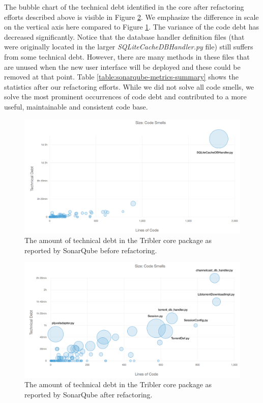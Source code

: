 The bubble chart of the technical debt identified in the core after refactoring efforts described above is visible in Figure \ref{fig:technical-debt-core-after}. We emphasize the difference in scale on the vertical axis here compared to Figure \ref{fig:technical-debt-core-before}. The variance of the code debt has decreased significantly. Notice that the database handler definition files (that were originally located in the larger \emph{SQLiteCacheDBHandler.py} file) still suffers from some technical debt. However, there are many methods in these files that are unused when the new user interface will be deployed and these could be removed at that point. Table \ref{table:sonarqube-metrics-summary} shows the statistics after our refactoring efforts. While we did not solve all code smells, we solve the most prominent occurrences of code debt and contributed to a more useful, maintainable and consistent code base.

\begin{figure}[h!]
	\centering
	\includegraphics[width=1.0\columnwidth]{images/improving_qa/technical_debt_core_before}
	\caption{The amount of technical debt in the Tribler core package as reported by SonarQube before refactoring.}
	\label{fig:technical-debt-core-before}
\end{figure}

\begin{figure}[h!]
	\centering
	\includegraphics[width=1.0\columnwidth]{images/improving_qa/technical_debt_core_after}
	\caption{The amount of technical debt in the Tribler core package as reported by SonarQube after refactoring.}
	\label{fig:technical-debt-core-after}
\end{figure}

